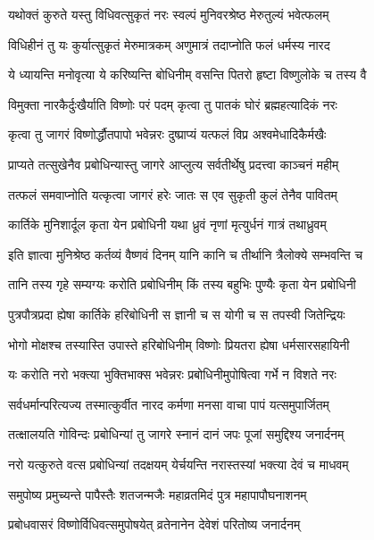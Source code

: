 \twolineshloka
{यथोक्तं कुरुते यस्तु विधिवत्सुकृतं नरः}
{स्वल्पं मुनिवरश्रेष्ठ मेरुतुल्यं भवेत्फलम्}%

\twolineshloka
{विधिहीनं तु यः कुर्यात्सुकृतं मेरुमात्रकम्}
{अणुमात्रं तदाप्नोति फलं धर्मस्य नारद}%

\twolineshloka
{ये ध्यायन्ति मनोवृत्या ये करिष्यन्ति बोधिनीम्}
{वसन्ति पितरो हृष्टा विष्णुलोके च तस्य वै}%

\twolineshloka
{विमुक्ता नारकैर्दुःखैर्याति विष्णोः परं पदम्}
{कृत्वा तु पातकं घोरं ब्रह्महत्यादिकं नरः}%

\twolineshloka
{कृत्वा तु जागरं विष्णोर्द्धौतपापो भवेन्नरः}
{दुष्प्राप्यं यत्फलं विप्र अश्वमेधादिकैर्मखैः}%

\twolineshloka
{प्राप्यते तत्सुखेनैव प्रबोधिन्यास्तु जागरे}
{आप्लुत्य सर्वतीर्थेषु प्रदत्त्वा काञ्चनं महीम्}%

\twolineshloka
{तत्फलं समवाप्नोति यत्कृत्वा जागरं हरेः}
{जातः स एव सुकृती कुलं तेनैव पावितम्}%

\twolineshloka
{कार्तिके मुनिशार्दूल कृता येन प्रबोधिनी}
{यथा ध्रुवं नृणां मृत्युर्धनं गात्रं तथाध्रुवम्}%

\twolineshloka
{इति ज्ञात्वा मुनिश्रेष्ठ कर्तव्यं वैष्णवं दिनम्}
{यानि कानि च तीर्थानि त्रैलोक्ये सम्भवन्ति च}%

\twolineshloka
{तानि तस्य गृहे सम्यग्यः करोति प्रबोधिनीम्}
{किं तस्य बहुभिः पुण्यैः कृता येन प्रबोधिनी}%

\twolineshloka
{पुत्रपौत्रप्रदा ह्येषा कार्तिके हरिबोधिनी}
{स ज्ञानी च स योगी च स तपस्वी जितेन्द्रियः}%

\twolineshloka
{भोगो मोक्षश्च तस्यास्ति उपास्ते हरिबोधिनीम्}
{विष्णोः प्रियतरा ह्येषा धर्मसारसहायिनी}%

\twolineshloka
{यः करोति नरो भक्त्या भुक्तिभाक्स भवेन्नरः}
{प्रबोधिनीमुपोषित्वा गर्भे न विशते नरः}%

\twolineshloka
{सर्वधर्मान्परित्यज्य तस्मात्कुर्वीत नारद}
{कर्मणा मनसा वाचा पापं यत्समुपार्जितम्}%

\twolineshloka
{तत्क्षालयति गोविन्दः प्रबोधिन्यां तु जागरे}
{स्नानं दानं जपः पूजां समुद्दिश्य जनार्दनम्}%

\twolineshloka
{नरो यत्कुरुते वत्स प्रबोधिन्यां तदक्षयम्}
{येर्चयन्ति नरास्तस्यां भक्त्या देवं च माधवम्}%

\twolineshloka
{समुपोष्य प्रमुच्यन्ते पापैस्तैः शतजन्मजैः}
{महाव्रतमिदं पुत्र महापापौघनाशनम्}%

\twolineshloka
{प्रबोधवासरं विष्णोर्विधिवत्समुपोषयेत्}
{व्रतेनानेन देवेशं परितोष्य जनार्दनम्}%

